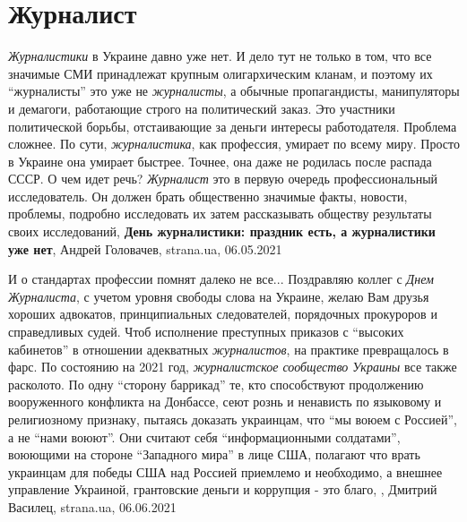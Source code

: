  
 
 
 
 
\chapter{Журналист}
\label{sec:slova.zhurnalist}

\emph{Журналистики} в Украине давно уже нет. И дело тут не только в том, что
все значимые СМИ принадлежат крупным олигархическим кланам, и поэтому их
\enquote{журналисты} это уже не \emph{журналисты}, а обычные пропагандисты,
манипуляторы и демагоги, работающие строго на политический заказ. Это участники
политической борьбы, отстаивающие за деньги интересы работодателя. Проблема
сложнее. По сути, \emph{журналистика}, как профессия, умирает по всему миру.
Просто в Украине она умирает быстрее. Точнее, она даже не родилась после
распада СССР. О чем идет речь?  \emph{Журналист} это в первую очередь
профессиональный исследователь. Он должен брать общественно значимые факты,
новости, проблемы, подробно исследовать их затем рассказывать обществу
результаты своих исследований,
\textbf{День журналистики: праздник есть, а журналистики уже нет},
Андрей Головачев, strana.ua, 06.05.2021

И о стандартах профессии помнят далеко не все...  Поздравляю коллег с \emph{Днем
Журналиста}, с учетом уровня свободы слова на Украине, желаю Вам друзья хороших
адвокатов, принципиальных следователей, порядочных прокуроров и справедливых
судей. Чтоб исполнение преступных приказов с \enquote{высоких кабинетов} в отношении
адекватных \emph{журналистов}, на практике превращалось в фарс.  По состоянию на 2021
год, \emph{журналистское сообщество Украины} все также расколото. По одну \enquote{сторону
баррикад} те, кто способствуют продолжению вооруженного конфликта на Донбассе,
сеют рознь и ненависть по языковому и религиозному признаку, пытаясь доказать
украинцам, что \enquote{мы воюем с Россией}, а не \enquote{нами воюют}. Они считают себя
\enquote{информационными солдатами}, воюющими на стороне \enquote{Западного мира} в лице США,
полагают что врать украинцам для победы США над Россией приемлемо и
необходимо, а внешнее управление Украиной, грантовские деньги и коррупция -
это благо,
, 
Дмитрий Василец, strana.ua, 06.06.2021

